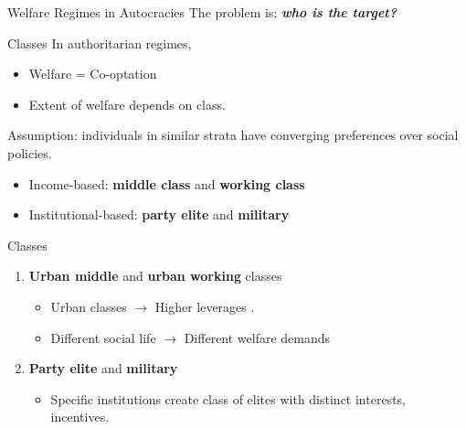 \documentclass{Bredelebeamer}
\begin{document}
\begin{frame}{Welfare Regimes in Autocracies}
\centering The problem is: \pause \textbf{\textit{who is the target?}} %
\end{frame}

\begin{frame}{Classes}
In authoritarian regimes,
	\begin{itemize}
		\item Welfare = Co-optation
		\item Extent of welfare depends on class. %
	\end{itemize}
Assumption: individuals in similar strata have converging preferences over social policies.
	\begin{itemize}
		\item Income-based: \textbf{middle class} and \textbf{working class}
		\item Institutional-based: \textbf{party elite} and \textbf{military}
		\end{itemize}
\end{frame}

\begin{frame}{Classes}
\begin{enumerate}
	\item \textbf{Urban middle} and \textbf{urban working} classes
	\begin{itemize}
		\item Urban classes $\rightarrow$ Higher leverages \citep{Dahlum2019}.
		\item Different social life $\rightarrow$ Different welfare demands
	\end{itemize}
	\item \textbf{Party elite} and \textbf{military}
	\begin{itemize}
		\item Specific institutions create class of elites with distinct interests, incentives.
	\end{itemize}
\end{enumerate}

\end{frame}
\end{document}
